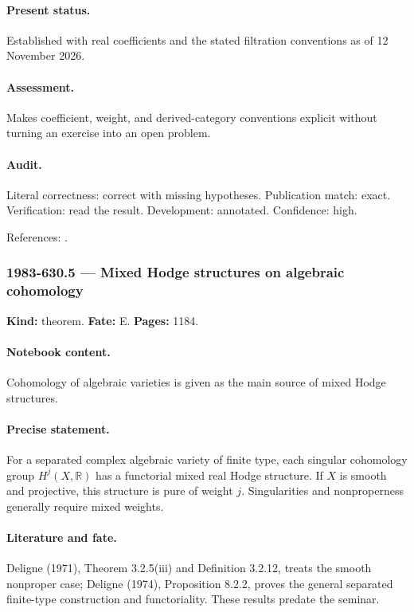 \paragraph{Present status.} Established with real coefficients and the stated filtration conventions as of 12 November 2026.

\paragraph{Assessment.} Makes coefficient, weight, and derived-category conventions explicit without turning an exercise into an open problem.

\paragraph{Audit.} Literal correctness: correct with missing hypotheses. Publication match: exact. Verification: read the result. Development: annotated. Confidence: high.

\noindent References: \citep{deligne1971hodge}.\par

\subsubsection{1983-630.5 --- Mixed Hodge structures on algebraic cohomology}

\label{item:1983-630.5}

\noindent\textbf{Kind:} theorem. \textbf{Fate:} E. \textbf{Pages:} 1184.\par

\paragraph{Notebook content.} Cohomology of algebraic varieties is given as the main source of mixed Hodge structures.

\paragraph{Precise statement.} For a separated complex algebraic variety of finite type, each singular cohomology group \(H^j(X,\mathbb R)\) has a functorial mixed real Hodge structure. If \(X\) is smooth and projective, this structure is pure of weight \(j\). Singularities and nonproperness generally require mixed weights.

\paragraph{Literature and fate.} Deligne (1971), Theorem 3.2.5(iii) and Definition 3.2.12, treats the smooth nonproper case; Deligne (1974), Proposition 8.2.2, proves the general separated finite-type construction and functoriality. These results predate the seminar.

